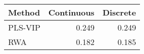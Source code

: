 \begin{small}
\begin{ttfamily}
\begin{tabular}{lrr}
\toprule
Method & Continuous & Discrete \\
\midrule
PLS-VIP & 0.249 & 0.249 \\
RWA & 0.182 & 0.185 \\
\bottomrule
\end{tabular}
\end{ttfamily}
\end{small}
